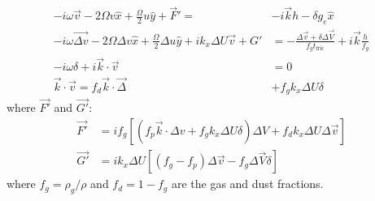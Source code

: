 \documentclass[12pt]{article}
\begin{document}
\begin{align}
    \label{eq:perturbstart}
    -i\omega\vec{v} -2\Omega v \hat x + \frac{\Omega}{2}u\hat y + \vec{F}' =& -i\vec{k}h - \delta g_e \hat x \\
    -i\omega\vec{\Delta v} - 2\Omega\Delta v \hat x + \frac{\Omega}{2}\Delta u\hat y + ik_x\Delta U \vec{v} + G' &= -\frac{\Delta \vec{v}+\delta \Delta\vec{V}}{f_gt_\mathrm{fric}} + i\vec{k}\frac{h}{f_g} \\
    -i\omega \delta + i\vec{k}\cdot\vec{v} &= 0 \\
    \vec{k}\cdot\vec{v} = f_d\vec{k}\cdot\vec{\Delta}& + f_gk_x\Delta U\delta
\end{align}
where $\vec{F'}$ and $\vec{G'}$:
\begin{align}
    \vec{F'} &= if_g\left[(f_p\vec{k}\cdot\Delta v + f_gk_x\Delta U\delta)\Delta V + f_dk_x\Delta U\Delta\vec{v}\right] \\ 
    \vec{G'} &= ik_x\Delta U\left[(f_g-f_p)\Delta\vec{v} - f_g\Delta\vec{V}\delta\right]
    \label{eq:perturbend}
\end{align}
where $f_g=\rho_g/\rho$ and $f_d=1-f_g$ are the gas and dust fractions. 
\end{document}
